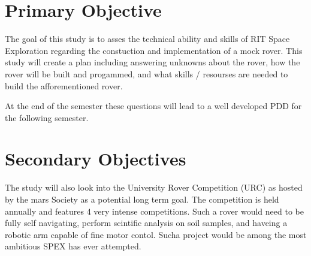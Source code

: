 \documentclass[conference]{IEEEtran} %
\begin{document}
\section{Primary Objective}
\label{sec:primary-obj}

The goal of this study is to asses the technical ability and skills of RIT Space Exploration regarding the constuction and implementation of a mock rover. 
This study will create a plan including answering unknowns about the rover, how the rover will be built and progammed, and what skills / resourses are needed to build the afforementioned rover. 

At the end of the semester these questions will lead to a well developed PDD for the following semester.  


\section{Secondary Objectives}
\label{sec:secondary-obj}
The study will also look into the University Rover Competition (URC) as hosted by the mars Society as a potential long term goal. The competition is held annually and features 4 very intense competitions. Such a rover would need to be fully self navigating, perform scintific analysis on soil samples, and haveing a robotic arm capable of fine motor contol. Sucha project would be among the most ambitious SPEX has ever attempted. 
\end{document}
